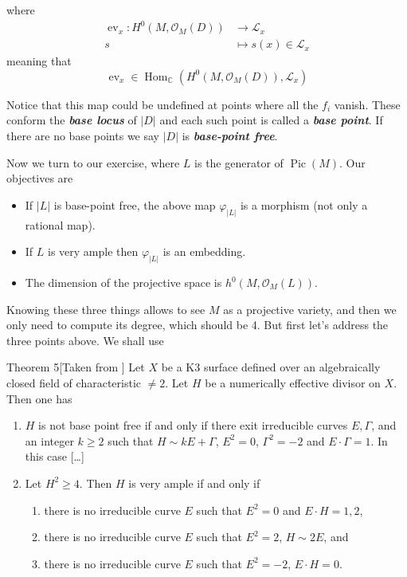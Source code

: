 where
\begin{align*}
	\operatorname{ev}_x: H^{0}(M,\mathcal{O}_M(D)) &\longrightarrow \mathcal{L}_x \\
	s &\longmapsto s(x)\in\mathcal{L}_x
\end{align*}
meaning that
\[\operatorname{ev}_x\in\operatorname{Hom}_\mathbb{C}(H^{0}(M,\mathcal{O}_M(D)),\mathcal{L}_x)\]


Notice that this map could be undefined at points where all the $f_i$ vanish. These conform the \textit{\textbf{base locus}} of  $|D|$ and each such point is called a \textit{\textbf{base point}}. If there are no base points we say $|D|$ is \textit{\textbf{base-point free}}.

Now we turn to our exercise, where $L$ is the generator of $\operatorname{Pic}(M)$.  Our objectives are
	\begin{itemize}
	\item If $|L|$ is base-point free, the above map $\varphi_{|L|}$ is a morphism (not only a rational map).
	\item If $L$ is very ample then $\varphi_{|L|}$ is an embedding.
	\item The dimension of the projective space is $h^{0}(M,\mathcal{O}_M(L))$.
	\end{itemize}
Knowing these three things allows to see $M$ as a projective variety, and then we only need to compute its degree, which should be 4. But first let's address the three points above. We shall use

\begin{thing5}{Theorem 5}[Taken from \cite{mori}]\leavevmode
	Let $X$ be a K3 surface defined over an algebraically closed field of characteristic $\neq 2$. Let $H$ be a numerically effective divisor on $X$. Then one has
	\begin{enumerate}
		\item $H$ is not base point free if and only if there exit irreducible curves $E,\Gamma$, and an integer $k\geq 2$ such that $H\sim kE+\Gamma$, $E^2=0$, $\Gamma^2=-2$ and $E\cdot \Gamma=1$. In this case […]
		\item Let $H^2\geq 4$. Then $H$ is very ample if and only if
			\begin{enumerate}
				\item there is no irreducible curve $E$ such that $E^2=0$ and $E\cdot H=1,2$,
				\item there is no irreducible curve $E$ such that $E^2=2$, $H\sim 2E$, and
				\item there is no irreducible curve $E$ such that $E^2=-2$, $E\cdot H=0$.
			\end{enumerate}
	\end{enumerate}
\end{thing5}

